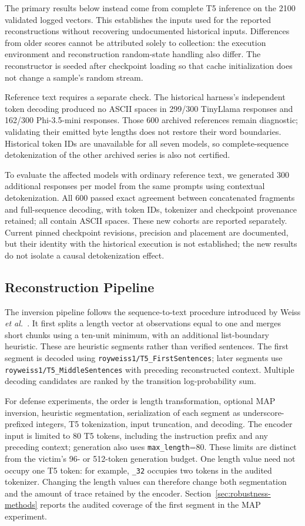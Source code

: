 \documentclass[electronics,article,submit,pdftex,moreauthors]{Definitions/mdpi}
\begin{document}
The primary results below instead come from complete T5 inference on the 2100 validated logged vectors. This establishes the inputs used for the reported reconstructions without recovering undocumented historical inputs. Differences from older scores cannot be attributed solely to collection: the execution environment and reconstruction random-state handling also differ. The reconstructor is seeded after checkpoint loading so that cache initialization does not change a sample's random stream.

Reference text requires a separate check. The historical harness's independent token decoding produced no ASCII spaces in 299/300 TinyLlama responses and 162/300 Phi-3.5-mini responses. Those 600 archived references remain diagnostic; validating their emitted byte lengths does not restore their word boundaries. Historical token IDs are unavailable for all seven models, so complete-sequence detokenization of the other archived series is also not certified.

To evaluate the affected models with ordinary reference text, we generated 300 additional responses per model from the same prompts using contextual detokenization. All 600 passed exact agreement between concatenated fragments and full-sequence decoding, with token IDs, tokenizer and checkpoint provenance retained; all contain ASCII spaces. These new cohorts are reported separately. Current pinned checkpoint revisions, precision and placement are documented, but their identity with the historical execution is not established; the new results do not isolate a causal detokenization effect.

\subsection{Reconstruction Pipeline}
The inversion pipeline follows the sequence-to-text procedure introduced by Weiss \emph{et al.}~\cite{weiss2024prompt}. It first splits a length vector at observations equal to one and merges short chunks using a ten-unit minimum, with an additional list-boundary heuristic. These are heuristic segments rather than verified sentences. The first segment is decoded using \texttt{royweiss1/T5\_FirstSentences}; later segments use \texttt{royweiss1/T5\_MiddleSentences} with preceding reconstructed context. Multiple decoding candidates are ranked by the transition log-probability sum.

For defense experiments, the order is length transformation, optional MAP inversion, heuristic segmentation, serialization of each segment as underscore-prefixed integers, T5 tokenization, input truncation, and decoding. The encoder input is limited to 80 T5 tokens, including the instruction prefix and any preceding context; generation also uses \texttt{max\_length}=80. These limits are distinct from the victim's 96- or 512-token generation budget. One length value need not occupy one T5 token: for example, \texttt{\_32} occupies two tokens in the audited tokenizer. Changing the length values can therefore change both segmentation and the amount of trace retained by the encoder. Section~\ref{sec:robustness-methods} reports the audited coverage of the first segment in the MAP experiment.
\end{document}
